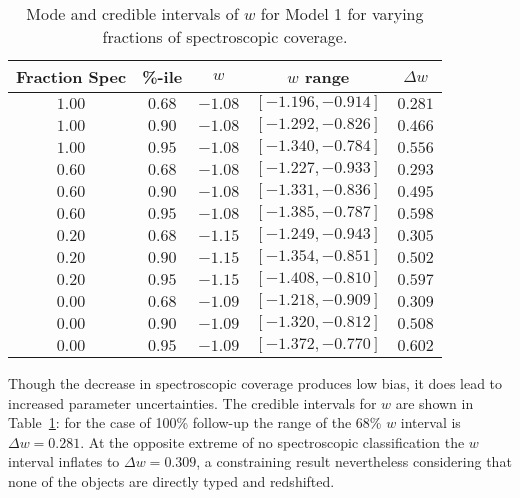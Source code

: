 \documentclass[preprint]{aastex}
\begin{document}
\begin{table}
\centering
\begin{tabular}{|c|c|ccc|}
\hline
Fraction Spec&\%-ile & $w$ &$w$ range & $\Delta w$\\ \hline
$1.00$ &$0.68$ &$-1.08$ & $[-1.196, -0.914]$ & $0.281$ \\
$1.00$ &$0.90$ &$-1.08$ & $[-1.292, -0.826]$ & $0.466$ \\
$1.00$ &$0.95$ &$-1.08$ & $[-1.340, -0.784]$ & $0.556$ \\
$0.60$ &$0.68$ &$-1.08$ & $[-1.227, -0.933]$ & $0.293$ \\
$0.60$ &$0.90$ &$-1.08$ & $[-1.331, -0.836]$ & $0.495$ \\
$0.60$ &$0.95$ &$-1.08$ & $[-1.385, -0.787]$ & $0.598$ \\
$0.20$ &$0.68$ &$-1.15$ & $[-1.249, -0.943]$ & $0.305$ \\
$0.20$ &$0.90$ &$-1.15$ & $[-1.354, -0.851]$ & $0.502$ \\
$0.20$ &$0.95$ &$-1.15$ & $[-1.408, -0.810]$ & $0.597$ \\
$0.00$ &$0.68$ &$-1.09$ & $[-1.218, -0.909]$ & $0.309$ \\
$0.00$ &$0.90$ &$-1.09$ & $[-1.320, -0.812]$ & $0.508$ \\
$0.00$ &$0.95$ &$-1.09$ & $[-1.372, -0.770]$ & $0.602$ \\
\hline
\end{tabular}
\caption{Mode and credible intervals of $w$ for Model 1 for varying
fractions of spectroscopic coverage. \label{seed2:tab}}
\end{table}


Though the decrease in spectroscopic coverage produces low bias, it does lead to
increased parameter uncertainties.
The credible intervals for $w$ are shown in Table~\ref{seed2:tab}:
for the case of 100\% follow-up the range of the 68\% $w$ interval is $\Delta w = 0.281$. 
At the opposite extreme of no spectroscopic classification the $w$ interval inflates to
$\Delta w = 0.309$, a constraining result nevertheless considering that none of the
objects are directly typed and redshifted.
\end{document}
